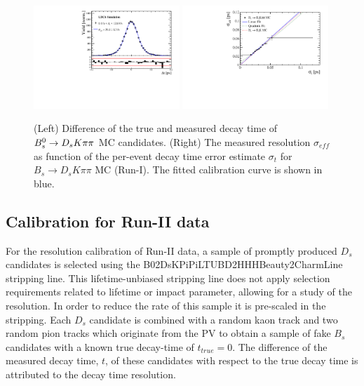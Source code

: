 \begin{figure}[h]
\centering
\includegraphics[height=!,width=0.49\textwidth]{figs/Resolution/SignalMC_bin_all.pdf}
\includegraphics[height=!,width=0.49\textwidth]{figs/Resolution/ScaleFactor_MC.pdf}
\caption{ (Left) Difference of the true and measured decay time of ${{B}^0_{s}}\rightarrow{\ensuremath{{D}_{s}}}{\ensuremath{K}}{\ensuremath{\pi}}{\ensuremath{\pi}}$ MC candidates. 
(Right) The measured resolution $\sigma_{eff}$ as function of the per-event decay time error estimate $\sigma_t$ for $B_s \to D_s K \pi \pi$ MC (Run-I). 
The fitted calibration curve is shown in blue.}
\label{fig:scaleFactorMC}
\end{figure}

\subsection{Calibration for Run-II data }
\label{ssec:ResRun2}

For the resolution calibration of Run-II data, a sample of promptly produced $D_s$ candidates is selected
using the \textsf{B02DsKPiPiLTUBD2HHHBeauty2CharmLine} stripping line.
This lifetime-unbiased stripping line does not apply selection requirements related to lifetime or impact parameter, allowing for a study of the resolution. 
In order to reduce the rate of this sample it is pre-scaled in the stripping.
Each $D_s$ candidate is combined with a random kaon track and two random pion tracks which originate from the PV to obtain a sample of fake $B_s$ candidates with a known true decay-time of $t_{true} = 0$. 
The difference of the measured decay time, $t$, of these candidates with respect to the true decay time is attributed to the decay time resolution. 


